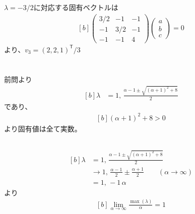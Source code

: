\documentclass[../ap_2012.tex]{subfiles}
\begin{document}
\(\lambda=-3/2\)に対応する固有ベクトルは
\begin{equation}\begin{aligned}[b]
    \begin{pmatrix}
        3/2 & -1 & -1\\
        -1 & 3/2 & -1\\
        -1 & -1 & 4
    \end{pmatrix}\begin{pmatrix}
        a\\b\\c
    \end{pmatrix}
    =0
\end{aligned}\end{equation}
より、\(v_3=(2,2,1)^\mathsf{T}/3\)

\section{}
\subsection{}
前問より
\begin{equation}\begin{aligned}[b]
    \lambda &= 1,\,\frac{\alpha-1\pm\sqrt{(\alpha+1)^2+8}}{2}
\end{aligned}\end{equation}
であり、
\begin{equation}\begin{aligned}[b]
    (\alpha+1)^2+8 > 0
\end{aligned}\end{equation}
より固有値は全て実数。
\subsection{}
\begin{equation}\begin{aligned}[b]
    \lambda &= 1,\,\frac{\alpha-1\pm\sqrt{(\alpha+1)^2+8}}{2}\\
    &\to 1,\,\frac{\alpha-1}{2}\pm\frac{\alpha+1}{2}\qquad(\alpha\to\infty)\\
    &= 1,\,-1\,\alpha
\end{aligned}\end{equation}
より
\begin{equation}\begin{aligned}[b]
    \lim_{\alpha\to\infty}\frac{\max(\lambda)}{\alpha} = 1
\end{aligned}\end{equation}
\end{document}
